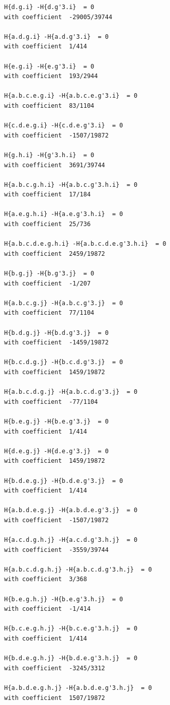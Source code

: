 \documentclass[11pt, a4paper]{kybernetika}
\begin{document}
\begin{verbatim}
		H{d.g.i} -H{d.g'3.i}  = 0
		with coefficient  -29005/39744
		
		H{a.d.g.i} -H{a.d.g'3.i}  = 0
		with coefficient  1/414
		
		H{e.g.i} -H{e.g'3.i}  = 0
		with coefficient  193/2944
		
		H{a.b.c.e.g.i} -H{a.b.c.e.g'3.i}  = 0
		with coefficient  83/1104
		
		H{c.d.e.g.i} -H{c.d.e.g'3.i}  = 0
		with coefficient  -1507/19872
		
		H{g.h.i} -H{g'3.h.i}  = 0
		with coefficient  3691/39744
		
		H{a.b.c.g.h.i} -H{a.b.c.g'3.h.i}  = 0
		with coefficient  17/184
		
		H{a.e.g.h.i} -H{a.e.g'3.h.i}  = 0
		with coefficient  25/736
		
		H{a.b.c.d.e.g.h.i} -H{a.b.c.d.e.g'3.h.i}  = 0
		with coefficient  2459/19872
		
		H{b.g.j} -H{b.g'3.j}  = 0
		with coefficient  -1/207
		
		H{a.b.c.g.j} -H{a.b.c.g'3.j}  = 0
		with coefficient  77/1104
		
		H{b.d.g.j} -H{b.d.g'3.j}  = 0
		with coefficient  -1459/19872
		
		H{b.c.d.g.j} -H{b.c.d.g'3.j}  = 0
		with coefficient  1459/19872
		
		H{a.b.c.d.g.j} -H{a.b.c.d.g'3.j}  = 0
		with coefficient  -77/1104
		
		H{b.e.g.j} -H{b.e.g'3.j}  = 0
		with coefficient  1/414
		
		H{d.e.g.j} -H{d.e.g'3.j}  = 0
		with coefficient  1459/19872
		
		H{b.d.e.g.j} -H{b.d.e.g'3.j}  = 0
		with coefficient  1/414
		
		H{a.b.d.e.g.j} -H{a.b.d.e.g'3.j}  = 0
		with coefficient  -1507/19872
		
		H{a.c.d.g.h.j} -H{a.c.d.g'3.h.j}  = 0
		with coefficient  -3559/39744
		
		H{a.b.c.d.g.h.j} -H{a.b.c.d.g'3.h.j}  = 0
		with coefficient  3/368
		
		H{b.e.g.h.j} -H{b.e.g'3.h.j}  = 0
		with coefficient  -1/414
		
		H{b.c.e.g.h.j} -H{b.c.e.g'3.h.j}  = 0
		with coefficient  1/414
		
		H{b.d.e.g.h.j} -H{b.d.e.g'3.h.j}  = 0
		with coefficient  -3245/3312
		
		H{a.b.d.e.g.h.j} -H{a.b.d.e.g'3.h.j}  = 0
		with coefficient  1507/19872
		

\end{verbatim}
\end{document}
